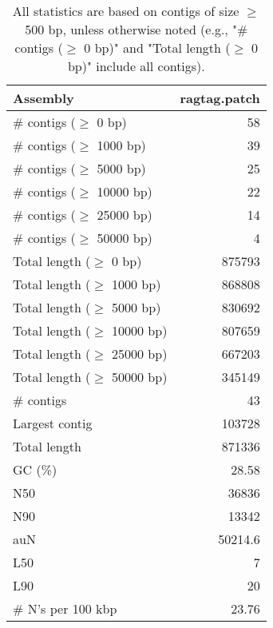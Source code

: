 \documentclass[12pt,a4paper]{article}
\begin{document}
\begin{table}[ht]
\begin{center}
\caption{All statistics are based on contigs of size $\geq$ 500 bp, unless otherwise noted (e.g., "\# contigs ($\geq$ 0 bp)" and "Total length ($\geq$ 0 bp)" include all contigs).}
\begin{tabular}{|l*{1}{|r}|}
\hline
Assembly & ragtag.patch \\ \hline
\# contigs ($\geq$ 0 bp) & 58 \\ \hline
\# contigs ($\geq$ 1000 bp) & 39 \\ \hline
\# contigs ($\geq$ 5000 bp) & 25 \\ \hline
\# contigs ($\geq$ 10000 bp) & 22 \\ \hline
\# contigs ($\geq$ 25000 bp) & 14 \\ \hline
\# contigs ($\geq$ 50000 bp) & 4 \\ \hline
Total length ($\geq$ 0 bp) & 875793 \\ \hline
Total length ($\geq$ 1000 bp) & 868808 \\ \hline
Total length ($\geq$ 5000 bp) & 830692 \\ \hline
Total length ($\geq$ 10000 bp) & 807659 \\ \hline
Total length ($\geq$ 25000 bp) & 667203 \\ \hline
Total length ($\geq$ 50000 bp) & 345149 \\ \hline
\# contigs & 43 \\ \hline
Largest contig & 103728 \\ \hline
Total length & 871336 \\ \hline
GC (\%) & 28.58 \\ \hline
N50 & 36836 \\ \hline
N90 & 13342 \\ \hline
auN & 50214.6 \\ \hline
L50 & 7 \\ \hline
L90 & 20 \\ \hline
\# N's per 100 kbp & 23.76 \\ \hline
\end{tabular}
\end{center}
\end{table}
\end{document}
